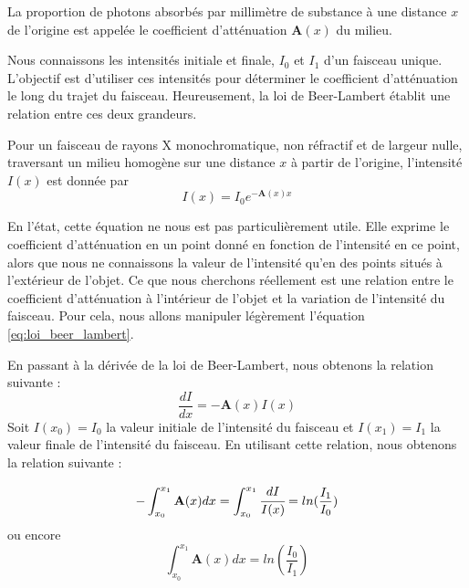 \begin{definition}
    La proportion de photons absorbés par millimètre de substance à une distance $x$ de l'origine est appelée le coefficient d'atténuation $\mathbf{A}(x)$ du milieu.
\end{definition}


Nous connaissons les intensités initiale et finale, $I_0$ et $I_1$ d'un faisceau unique. L'objectif est d'utiliser ces intensités pour déterminer le coefficient d'atténuation le long du trajet du faisceau. Heureusement, la loi de Beer-Lambert établit une relation entre ces deux grandeurs.

\begin{definition}
Pour un faisceau de rayons X monochromatique, non réfractif et de largeur nulle,
traversant un milieu homogène sur une distance \(x\) à partir de l'origine,
l'intensité \(I(x)\) est donnée par
\begin{equation}
    I(x) = I_0 e^{-\mathbf{A}(x)x}
    \label{eq:loi_beer_lambert}
\end{equation}
\end{definition}
En l'état, cette équation ne nous est pas particulièrement utile. Elle exprime le coefficient d'atténuation en un point donné en fonction de l'intensité en ce point, alors que nous ne connaissons la valeur de l'intensité qu'en des points situés à l'extérieur de l'objet. Ce que nous cherchons réellement est une relation entre le coefficient d'atténuation à l'intérieur de l'objet et la variation de l'intensité du faisceau. Pour cela, nous allons manipuler légèrement l'équation \eqref{eq:loi_beer_lambert}.

En passant à  la dérivée de la loi de Beer-Lambert, nous obtenons la relation suivante :
\begin{equation}
    \frac{dI}{dx} = -\mathbf{A}(x)I(x)
\end{equation}
Soit $I(x_0)=I_0$ la valeur initiale de l'intensité du faisceau et $I(x_1)=I_1$ la valeur finale de l'intensité du faisceau. En utilisant cette relation, nous obtenons la relation suivante :

\begin{equation}
    -\int_{x_0}^{x_1} \mathbf{A}(x)dx = \int_{x_0}^{x_1}\cfrac{dI}{I(x)}=ln(\frac{I_1}{I_0})
\end{equation}
ou encore 
\begin{equation}
    \int_{x_0}^{x_1} \mathbf{A}(x)dx = ln(\frac{I_0}{I_1})
    \label{eq:radon_transformation}
\end{equation}

